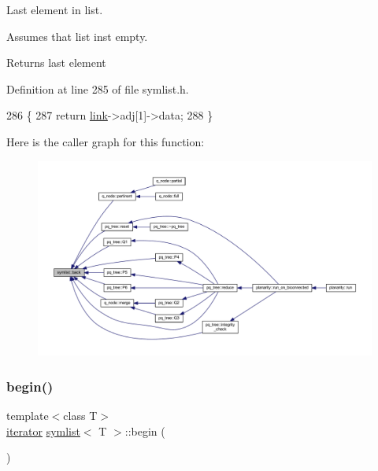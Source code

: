Last element in list. 

Assumes that list ins\textquotesingle{}t empty.

\begin{DoxyReturn}{Returns}
last element 
\end{DoxyReturn}


Definition at line 285 of file symlist.\+h.


\begin{DoxyCode}
286     \{
287     \textcolor{keywordflow}{return} \mbox{\hyperlink{classsymlist_a8fa81a7f6d0bb986bb593776db582c90}{link}}->adj[1]->data;
288     \}
\end{DoxyCode}
Here is the caller graph for this function\+:\nopagebreak
\begin{figure}[H]
\begin{center}
\leavevmode
\includegraphics[width=350pt]{classsymlist_abc0570ff78ded9210ac26865519d36e3_icgraph}
\end{center}
\end{figure}
\mbox{\label{classsymlist_a525b8d44af5d771fe15916372515cce0}} 
\subsubsection{\texorpdfstring{begin()}{begin()}\hspace{0.1cm}{\footnotesize\ttfamily [1/2]}}
{\footnotesize\ttfamily template$<$class T$>$ \\
\mbox{\hyperlink{classsymlist_a66045fbe3d98975e5537092ede8b50df}{iterator}} \mbox{\hyperlink{classsymlist}{symlist}}$<$ T $>$\+::begin (\begin{DoxyParamCaption}{ }\end{DoxyParamCaption})\hspace{0.3cm}{\ttfamily [inline]}}



